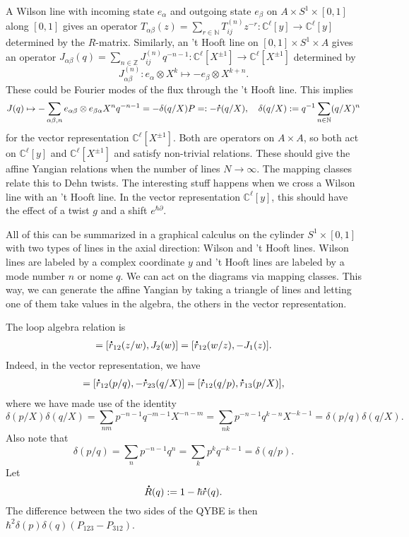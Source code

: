 \documentclass[11pt]{report}
\newcommand*{\dt}[1]{%
  \accentset{\mbox{\large\bfseries .}}{#1}}
\theoremstyle{definition}
\theoremstyle{remark}
\theoremstyle{remark}
\newcommand{\N}{\mathbb{N}}
\newcommand{\Z}{\mathbb{Z}}
\newcommand{\C}{\mathbb{C}}
\begin{document}
A Wilson line with incoming state $e_\alpha$ and outgoing state $e_\beta$ on $A \times S^1 \times [0,1]$ along $[0,1]$ gives an operator $T_{\alpha\beta}(z) = \sum_{r \in \N} T_{ij}^{(n)} z^{-r}: \C^\ell[y] \to \C^\ell[y]$ determined by the $R$-matrix. Similarly, an 't Hooft line on $[0,1] \times S^1 \times A$ gives an operator $J_{\alpha\beta}(q) = \sum_{n \in \Z} J_{ij}^{(n)} q^{-n-1}: \C^\ell[X^{\pm 1}] \to \C^\ell[X^{\pm 1}]$ determined by
\begin{equation*}
J_{\alpha\beta}^{(n)}: e_\alpha \otimes X^k \mapsto -e_\beta \otimes X^{k+n}.
\end{equation*}
These could be Fourier modes of the flux through the 't Hooft line. This implies
\begin{equation*}
J(q) \mapsto -\sum_{\alpha\beta,n} e_{\alpha\beta} \otimes e_{\beta\alpha} X^n q^{-n-1} = -\delta(q/X) P =: -\dt r(q/X), \quad \delta(q/X) := q^{-1} \sum_{n \in \N} (q/X)^n
\end{equation*}
for the vector representation $\C^\ell[X^{\pm 1}]$. Both are operators on $A \times A$, so both act on $\C^\ell[y]$ and $\C^\ell[X^{\pm 1}]$ and satisfy non-trivial relations. These should give the affine Yangian relations when the number of lines $N \to \infty$. The mapping classes relate this to Dehn twists. The interesting stuff happens when we cross a Wilson line with an 't Hooft line. In the vector representation $\C^\ell[y]$, this should have the effect of a twist $g$ and a shift $e^{\hbar \partial}$.

All of this can be summarized in a graphical calculus on the cylinder $S^1 \times [0,1]$ with two types of lines in the axial direction: Wilson and 't Hooft lines. Wilson lines are labeled by a complex coordinate $y$ and 't Hooft lines are labeled by a mode number $n$ or nome $q$. We can act on the diagrams via mapping classes. This way, we can generate the affine Yangian by taking a triangle of lines and letting one of them take values in the algebra, the others in the vector representation.

The loop algebra relation is
\begin{align*}
[J_1(z),J_2(w)] = [\dt r_{12}(z/w),J_2(w)] = [\dt r_{12}(w/z),-J_1(z)].
\end{align*}
Indeed, in the vector representation, we have
\begin{align*}
[-\dt r_{13}(p/X),-\dt r_{23}(q/X)] = [\dt r_{12}(p/q), -\dt r_{23}(q/X)] = [\dt r_{12}(q/p), \dt r_{13}(p/X)],
\end{align*}
where we have made use of the identity
\begin{equation*}
\delta(p/X) \delta(q/X) = \sum_{nm} p^{-n-1} q^{-m-1} X^{-n-m} = \sum_{nk} p^{-n-1} q^{k-n} X^{-k-1} = \delta(p/q) \delta(q/X).
\end{equation*}
Also note that
\begin{equation*}
\delta(p/q) = \sum_n p^{-n-1} q^n = \sum_k p^k q^{-k-1} = \delta(q/p).
\end{equation*}
Let
\begin{equation*}
\dt R(q) := 1 - \hbar \dt r(q).
\end{equation*}
The difference between the two sides of the QYBE is then $\hbar^2 \delta(p) \delta(q) (P_{123} - P_{312})$.
\end{document}
